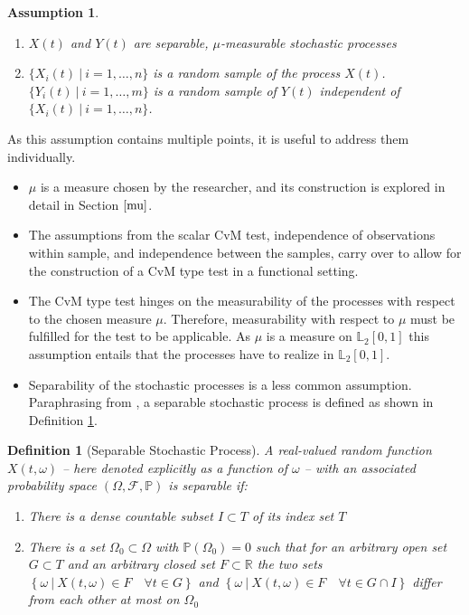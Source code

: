 \documentclass[12pt, a4paper]{article}
\theoremstyle{MAstyle} \newtheorem{assumption}{Assumption}[section]
\theoremstyle{MAstyle} \newtheorem{definition}{Definition}[section]
\theoremstyle{MAstyle} \newtheorem{theorem}{Theorem}[section]
\begin{document}
		\newpage
			\begin{assumption}\label{Ass1}\hfill\vspace{-0.8cm}
				\begin{enumerate}
					\item $X(t)$ and $Y(t)$ are separable, $\mu$-measurable stochastic processes
					\item $\{X_i(t) \: \vert \: i = 1, \dots, n\}$ is a random sample of the process $X(t)$. \\
					$\{Y_i(t) \: \vert \: i = 1, \dots, m\}$ is a random sample of $Y(t)$ independent of $\{X_i(t) \: \vert \: i = 1, \dots, n\}$.
				\end{enumerate}
			\end{assumption}
		As this assumption contains multiple points, it is useful to address them individually.
			\begin{itemize}
				\item $\mu$ is a measure chosen by the researcher, and its construction is explored in detail in Section $\ref{mu}$.
				\item The assumptions from the scalar CvM test, independence of observations within sample, and independence between the samples, carry over to allow for the construction of a CvM type test in a functional setting.
				\item The CvM type test hinges on the measurability of the processes with respect to the chosen measure $\mu$. Therefore, measurability with respect to $\mu$ must be fulfilled for the test to be applicable. As $\mu$ is a measure on $\mathbb{L}_2[0,1]$ this assumption entails that the processes have to realize in $\mathbb{L}_2[0,1]$.
				\item Separability of the stochastic processes is a less common assumption. Paraphrasing from \cite{gihman_theory_2004}, a separable stochastic process is defined as shown in Definition \ref{separability}.
			\end{itemize}
			\begin{definition}[Separable Stochastic Process]\label{separability}
				A real-valued random function $X(t, \omega)$ -- here denoted explicitly as a function of $\omega$ -- with an associated probability space $\left(\Omega, \mathcal{F}, \mathbb{P}\right)$ is separable if:
				\begin{enumerate}
					\item There is a dense countable subset $I \subset T$ of its index set $T$
					\item There is a set $\Omega_0 \subset \Omega$ with $\mathbb{P}\left(\Omega_0\right) = 0$ such that for an arbitrary open set $G \subset T$ and an arbitrary closed set $F \subset \mathbb{R}$ the two sets $\left\{\omega \ \vert \ X(t, \omega) \in F \quad \forall t \in G\right\}$ and $\left\{\omega \ \vert \ X(t, \omega) \in F \quad \forall t \in G \cap I\right\}$ differ from each other at most on $\Omega_0$
				\end{enumerate}      
			\end{definition}
\end{document}
